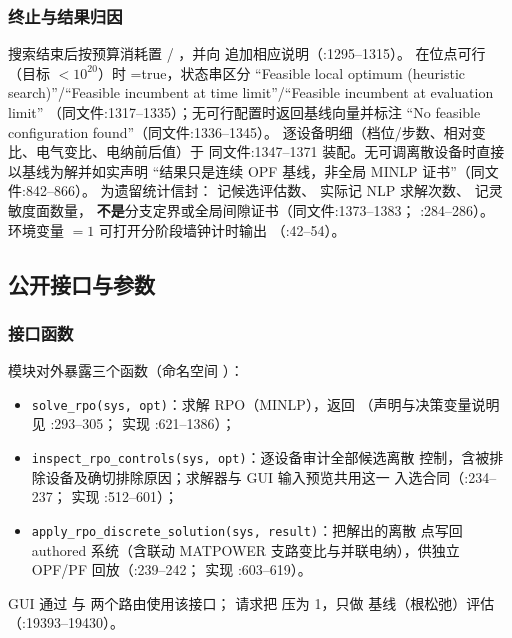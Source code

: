\subsubsection*{终止与结果归因}
搜索结束后按预算消耗置 /
，并向 
追加相应说明（:1295--1315）。
在位点可行（目标 $<10^{20}$）时 =true，状态串区分
“Feasible local optimum (heuristic search)”/“Feasible incumbent at time
limit”/“Feasible incumbent at evaluation limit”
（同文件:1317--1335）；无可行配置时返回基线向量并标注
“No feasible configuration found”（同文件:1336--1345）。
逐设备明细（档位/步数、相对变比、电气变比、电纳前后值）于
同文件:1347--1371 装配。无可调离散设备时直接以基线为解并如实声明
“结果只是连续 OPF 基线，非全局 MINLP 证书”（同文件:842--866）。
 为遗留统计信封： 记候选评估数、
 实际记 NLP 求解次数、 记灵敏度面数量，
\textbf{不是}分支定界或全局间隙证书（同文件:1373--1383；
:284--286）。
环境变量 ${}=1$ 可打开分阶段墙钟计时输出
（:42--54）。

\subsection{公开接口与参数}

\subsubsection*{接口函数}
模块对外暴露三个函数（命名空间 ）：
\begin{itemize}
  \item \texttt{solve\_rpo(sys, opt)}：求解 RPO（MINLP），返回
        （声明与决策变量说明见
        :293--305；
        实现 :621--1386）；
  \item \texttt{inspect\_rpo\_controls(sys, opt)}：逐设备审计全部候选离散
        控制，含被排除设备及确切排除原因；求解器与 GUI 输入预览共用这一
        入选合同（:234--237；
        实现 :512--601）；
  \item \texttt{apply\_rpo\_discrete\_solution(sys, result)}：把解出的离散
        点写回 authored 系统（含联动 MATPOWER 支路变比与并联电纳），供独立
        OPF/PF 回放（:239--242；
        实现 :603--619）。
\end{itemize}
GUI 通过  与 
两个路由使用该接口； 请求把  压为 1，只做
基线（根松弛）评估（:19393--19430）。

